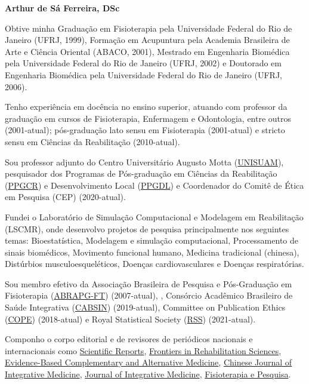 \documentclass[
]{book}
\begin{document}
\textbf{Arthur de Sá Ferreira, DSc}

Obtive minha Graduação em Fisioterapia pela Universidade Federal do Rio de Janeiro (UFRJ, 1999), Formação em Acupuntura pela Academia Brasileira de Arte e Ciência Oriental (ABACO, 2001), Mestrado em Engenharia Biomédica pela Universidade Federal do Rio de Janeiro (UFRJ, 2002) e Doutorado em Engenharia Biomédica pela Universidade Federal do Rio de Janeiro (UFRJ, 2006).

Tenho experiência em docência no ensino superior, atuando com professor da graduação em cursos de Fisioterapia, Enfermagem e Odontologia, entre outros (2001-atual); pós-graduação lato sensu em Fisioterapia (2001-atual) e stricto sensu em Ciências da Reabilitação (2010-atual).

Sou professor adjunto do Centro Universitário Augusto Motta (\href{https://www.unisuam.edu.br}{UNISUAM}), pesquisador dos Programas de Pós-graduação em Ciências da Reabilitação (\href{https://www.unisuam.edu.br/programa-pos-graduacao-ciencias-da-reabilitacao}{PPGCR}) e Desenvolvimento Local (\href{https://www.unisuam.edu.br/programa-pos-graduacao-desenvolvimento-local}{PPGDL}) e Coordenador do Comitê de Ética em Pesquisa (CEP) (2020-atual).

Fundei o Laboratório de Simulação Computacional e Modelagem em Reabilitação (LSCMR), onde desenvolvo projetos de pesquisa principalmente nos seguintes temas: Bioestatística, Modelagem e simulação computacional, Processamento de sinais biomédicos, Movimento funcional humano, Medicina tradicional (chinesa), Distúrbios musculoesqueléticos, Doenças cardiovasculares e Doenças respiratórias.

Sou membro efetivo da Associação Brasileira de Pesquisa e Pós-Graduação em Fisioterapia (\href{https://abrapg-ft.org.br/portal/}{ABRAPG-FT}) (2007-atual), , Consórcio Acadêmico Brasileiro de Saúde Integrativa (\href{https://cabsin.org.br}{CABSIN}) (2019-atual), Committee on Publication Ethics (\href{https://publicationethics.org}{COPE}) (2018-atual) e Royal Statistical Society (\href{https://rss.org.uk}{RSS}) (2021-atual).

Componho o corpo editorial e de revisores de periódicos nacionais e internacionais como \href{https://www.nature.com/srep/about/editors}{Scientific Reports}, \href{https://www.frontiersin.org/research-topics/26395/systemic-effects-and-disabilities-in-long-covid-syndrome-current-approaches-and-clinical-challenges}{Frontiers in Rehabilitation Sciences}, \href{https://www.hindawi.com/journals/ecam/editors/}{Evidence-Based Complementary and Alternative Medicine}, \href{https://www.springer.com/journal/11655/editors}{Chinese Journal of Integrative Medicine}, \href{https://www.journals.elsevier.com/journal-of-integrative-medicine/editorial-board}{Journal of Integrative Medicine}, \href{https://www.scielo.br/journal/fp/about/\#editors}{Fisioterapia e Pesquisa}.
\end{document}

